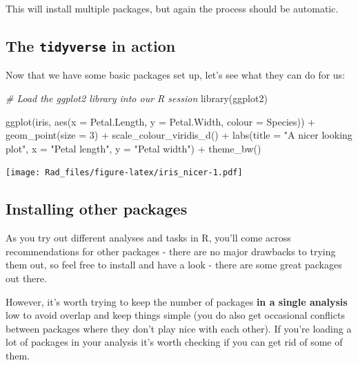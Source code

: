 \documentclass[
]{book}
\newenvironment{Shaded}{\begin{snugshade}}{\end{snugshade}}
\newcommand{\AttributeTok}[1]{\textcolor[rgb]{0.77,0.63,0.00}{#1}}
\newcommand{\CommentTok}[1]{\textcolor[rgb]{0.56,0.35,0.01}{\textit{#1}}}
\newcommand{\DecValTok}[1]{\textcolor[rgb]{0.00,0.00,0.81}{#1}}
\newcommand{\FunctionTok}[1]{\textcolor[rgb]{0.00,0.00,0.00}{#1}}
\newcommand{\NormalTok}[1]{#1}
\newcommand{\SpecialCharTok}[1]{\textcolor[rgb]{0.00,0.00,0.00}{#1}}
\newcommand{\StringTok}[1]{\textcolor[rgb]{0.31,0.60,0.02}{#1}}
\begin{document}
This will install multiple packages, but again the process should be
automatic.

\hypertarget{the-tidyverse-in-action}{%
\subsection{\texorpdfstring{The \texttt{tidyverse} in action}{The tidyverse in action}}\label{the-tidyverse-in-action}}

Now that we have some basic packages set up, let's see what they can
do for us:

\begin{Shaded}
\begin{Highlighting}[]
\CommentTok{\# Load the ggplot2 library into our R session}
\FunctionTok{library}\NormalTok{(ggplot2)}

\FunctionTok{ggplot}\NormalTok{(iris, }\FunctionTok{aes}\NormalTok{(}\AttributeTok{x =}\NormalTok{ Petal.Length, }\AttributeTok{y =}\NormalTok{ Petal.Width, }\AttributeTok{colour =}\NormalTok{ Species)) }\SpecialCharTok{+}
    \FunctionTok{geom\_point}\NormalTok{(}\AttributeTok{size =} \DecValTok{3}\NormalTok{) }\SpecialCharTok{+}
    \FunctionTok{scale\_colour\_viridis\_d}\NormalTok{() }\SpecialCharTok{+}
    \FunctionTok{labs}\NormalTok{(}\AttributeTok{title =} \StringTok{"A nicer looking plot"}\NormalTok{,}
         \AttributeTok{x =} \StringTok{"Petal length"}\NormalTok{, }\AttributeTok{y =} \StringTok{"Petal width"}\NormalTok{) }\SpecialCharTok{+}
    \FunctionTok{theme\_bw}\NormalTok{()}
\end{Highlighting}
\end{Shaded}

\texttt{[image: Rad\_files/figure-latex/iris\_nicer-1.pdf]}

\hypertarget{installing-other-packages}{%
\subsection{Installing other packages}\label{installing-other-packages}}

As you try out different analyses and tasks in R, you'll
come across recommendations for other packages - there are
no major drawbacks to trying them out, so feel free to install and have
a look - there are some great packages out there.

However, it's worth trying to keep the number of packages \textbf{in a single
analysis} low to avoid overlap and keep things simple (you do also get
occasional conflicts between packages where they don't play nice with each
other). If you're loading a lot of packages in your analysis
it's worth checking if you can get rid of some of them.
\end{document}
